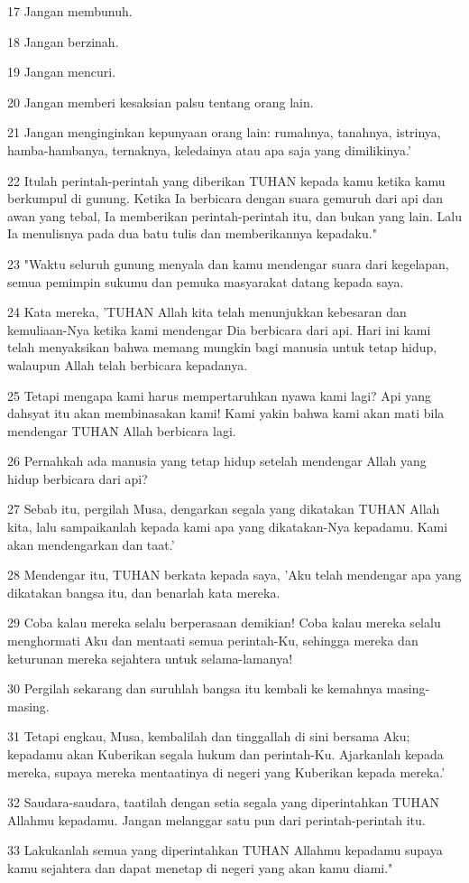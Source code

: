 \par 17 Jangan membunuh.
\par 18 Jangan berzinah.
\par 19 Jangan mencuri.
\par 20 Jangan memberi kesaksian palsu tentang orang lain.
\par 21 Jangan menginginkan kepunyaan orang lain: rumahnya, tanahnya, istrinya, hamba-hambanya, ternaknya, keledainya atau apa saja yang dimilikinya.'
\par 22 Itulah perintah-perintah yang diberikan TUHAN kepada kamu ketika kamu berkumpul di gunung. Ketika Ia berbicara dengan suara gemuruh dari api dan awan yang tebal, Ia memberikan perintah-perintah itu, dan bukan yang lain. Lalu Ia menulisnya pada dua batu tulis dan memberikannya kepadaku."
\par 23 "Waktu seluruh gunung menyala dan kamu mendengar suara dari kegelapan, semua pemimpin sukumu dan pemuka masyarakat datang kepada saya.
\par 24 Kata mereka, 'TUHAN Allah kita telah menunjukkan kebesaran dan kemuliaan-Nya ketika kami mendengar Dia berbicara dari api. Hari ini kami telah menyaksikan bahwa memang mungkin bagi manusia untuk tetap hidup, walaupun Allah telah berbicara kepadanya.
\par 25 Tetapi mengapa kami harus mempertaruhkan nyawa kami lagi? Api yang dahsyat itu akan membinasakan kami! Kami yakin bahwa kami akan mati bila mendengar TUHAN Allah berbicara lagi.
\par 26 Pernahkah ada manusia yang tetap hidup setelah mendengar Allah yang hidup berbicara dari api?
\par 27 Sebab itu, pergilah Musa, dengarkan segala yang dikatakan TUHAN Allah kita, lalu sampaikanlah kepada kami apa yang dikatakan-Nya kepadamu. Kami akan mendengarkan dan taat.'
\par 28 Mendengar itu, TUHAN berkata kepada saya, 'Aku telah mendengar apa yang dikatakan bangsa itu, dan benarlah kata mereka.
\par 29 Coba kalau mereka selalu berperasaan demikian! Coba kalau mereka selalu menghormati Aku dan mentaati semua perintah-Ku, sehingga mereka dan keturunan mereka sejahtera untuk selama-lamanya!
\par 30 Pergilah sekarang dan suruhlah bangsa itu kembali ke kemahnya masing-masing.
\par 31 Tetapi engkau, Musa, kembalilah dan tinggallah di sini bersama Aku; kepadamu akan Kuberikan segala hukum dan perintah-Ku. Ajarkanlah kepada mereka, supaya mereka mentaatinya di negeri yang Kuberikan kepada mereka.'
\par 32 Saudara-saudara, taatilah dengan setia segala yang diperintahkan TUHAN Allahmu kepadamu. Jangan melanggar satu pun dari perintah-perintah itu.
\par 33 Lakukanlah semua yang diperintahkan TUHAN Allahmu kepadamu supaya kamu sejahtera dan dapat menetap di negeri yang akan kamu diami."

